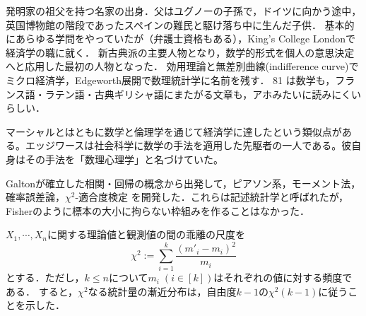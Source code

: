 \documentclass[uplatex,dvipdfmx]{jsreport}
\begin{document}
\begin{history}
    発明家の祖父を持つ名家の出身．父はユグノーの子孫で，ドイツに向かう途中，英国博物館の階段であったスペインの難民と駆け落ち中に生んだ子供．
    基本的にあらゆる学問をやっていたが（弁護士資格もある），King's College Londonで経済学の職に就く．
    新古典派の主要人物となり，数学的形式を個人の意思決定へと応用した最初の人物となった．
    効用理論と無差別曲線(indifference curve)でミクロ経済学，Edgeworth展開で数理統計学に名前を残す．
    81 \cite{Edgeworth81}は数学も，フランス語・ラテン語・古典ギリシャ語にまたがる文章も，アホみたいに読みにくいらしい．

    マーシャルとはともに数学と倫理学を通じて経済学に達したという類似点がある。エッジワースは社会科学に数学の手法を適用した先駆者の一人である。彼自身はその手法を「数理心理学」と名づけていた。
\end{history}

\begin{history}
    Galtonが確立した相関・回帰の概念から出発して，ピアソン系，モーメント法，確率誤差論，$\chi^2$-適合度検定
    を開発した．これらは記述統計学と呼ばれたが，Fisherのように標本の大小に拘らない枠組みを作ることはなかった．

    $X_1,\cdots,X_n$に関する理論値と観測値の間の乖離の尺度を
    \[\chi^2:=\sum^k_{i=1}\frac{(m'_i-m_i)^2}{m_i}\]
    とする．ただし，$k\le n$について$m_i\;(i\in[k])$はそれぞれの値に対する頻度である．
    すると，$\chi^2$なる統計量の漸近分布は，自由度$k-1$の$\chi^2(k-1)$に従うことを示した\cite{Pearson00}．
\end{history}
\end{document}
